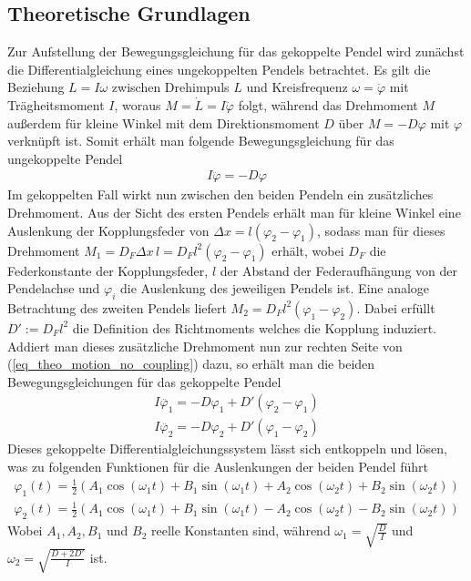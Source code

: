\documentclass[12pt,a4paper,german]{scrartcl}
\numberwithin{equation}{section}
\begin{document}
  \subsection{Theoretische Grundlagen}
  Zur Aufstellung der Bewegungsgleichung für das gekoppelte Pendel wird zunächst die Differentialgleichung eines ungekoppelten Pendels betrachtet.
  Es gilt die Beziehung $L = I \omega$ zwischen Drehimpuls $L$ und Kreisfrequenz $\omega = \dot{\varphi}$ mit Trägheitsmoment $I$, woraus $M = \dot{L} = I \ddot{\varphi}$ folgt, während das Drehmoment $M$ außerdem für kleine Winkel mit dem Direktionsmoment $D$ über $M = -D \varphi$ mit $\varphi$ verknüpft ist.
  Somit erhält man folgende Bewegungsgleichung für das ungekoppelte Pendel
  \begin{align}
    I \ddot{\varphi} = -D \varphi
    \label{eq_theo_motion_no_coupling}
  \end{align}
  Im gekoppelten Fall wirkt nun zwischen den beiden Pendeln ein zusätzliches Drehmoment.
  Aus der Sicht des ersten Pendels erhält man für kleine Winkel eine Auslenkung der Kopplungsfeder von $\Delta x = l (\varphi_2 - \varphi_1)$, sodass man für dieses Drehmoment $M_1 = D_F \Delta x \, l = D_F l^2 (\varphi_2 - \varphi_1)$ erhält, wobei $D_F$ die Federkonstante der Kopplungsfeder, $l$ der Abstand der Federaufhängung von der Pendelachse und $\varphi_i$ die Auslenkung des jeweiligen Pendels ist.
  Eine analoge Betrachtung des zweiten Pendels liefert $M_2 = D_F l^2 (\varphi_1 - \varphi_2)$.
  Dabei erfüllt $D' := D_F l^2$ die Definition des Richtmoments welches die Kopplung induziert.
  Addiert man dieses zusätzliche Drehmoment nun zur rechten Seite von (\ref{eq_theo_motion_no_coupling}) dazu, so erhält man die beiden Bewegungsgleichungen für das gekoppelte Pendel
  \begin{align}
    I \ddot{\varphi_1} = -D \varphi_1 + D' (\varphi_2 - \varphi_1) \nonumber \\
    I \ddot{\varphi_2} = -D \varphi_2 + D' (\varphi_1 - \varphi_2)
    \label{eq_theo_motion_coupling}
  \end{align}
  Dieses gekoppelte Differentialgleichungssystem lässt sich entkoppeln und lösen, was zu folgenden Funktionen für die Auslenkungen der beiden Pendel führt
  \begin{align}
    \varphi_1(t) = \frac{1}{2} (A_1 \cos(\omega_1 t) + B_1 \sin(\omega_1 t) + A_2 \cos(\omega_2 t) + B_2 \sin(\omega_2 t)) \nonumber \\
    \varphi_2(t) = \frac{1}{2} (A_1 \cos(\omega_1 t) + B_1 \sin(\omega_1 t) - A_2 \cos(\omega_2 t) - B_2 \sin(\omega_2 t))
    \label{eq_theo_motion_solution}
  \end{align}
  Wobei $A_1, A_2, B_1$ und $B_2$ reelle Konstanten sind, während $\omega_1 = \sqrt{\frac{D}{I}}$ und $\omega_2 = \sqrt{\frac{D + 2 D'}{I}}$ ist.
\end{document}
